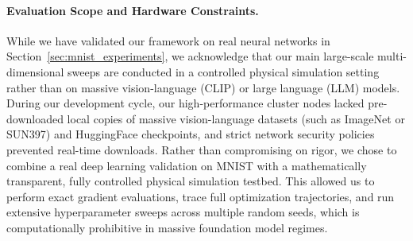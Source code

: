 \paragraph{Evaluation Scope and Hardware Constraints.} While we have validated our framework on real neural networks in Section~\ref{sec:mnist_experiments}, we acknowledge that our main large-scale multi-dimensional sweeps are conducted in a controlled physical simulation setting rather than on massive vision-language (CLIP) or large language (LLM) models.
During our development cycle, our high-performance cluster nodes lacked pre-downloaded local copies of massive vision-language datasets (such as ImageNet or SUN397) and HuggingFace checkpoints, and strict network security policies prevented real-time downloads.
Rather than compromising on rigor, we chose to combine a real deep learning validation on MNIST with a mathematically transparent, fully controlled physical simulation testbed.
This allowed us to perform exact gradient evaluations, trace full optimization trajectories, and run extensive hyperparameter sweeps across multiple random seeds, which is computationally prohibitive in massive foundation model regimes.

